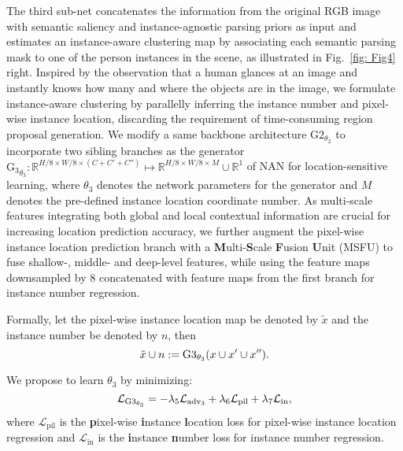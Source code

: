 \documentclass[10pt,twocolumn,letterpaper]{article}
\theoremstyle{definition}
\theoremstyle{remark}
\begin{document}
The third sub-net concatenates the information from the original RGB image with semantic saliency and instance-agnostic parsing priors as input and estimates an instance-aware clustering map by associating each semantic parsing mask to one of the person instances in the scene, as illustrated in Fig.~\ref{fig: Fig4} right. Inspired by the observation that a human glances at an image and instantly knows how many and where the objects are in the image, we formulate instance-aware clustering by parallelly inferring the instance number and pixel-wise instance location, discarding the requirement of time-consuming region proposal generation. We modify a same backbone architecture $\mathrm{G2}_{\theta_2}$ to incorporate two sibling branches as the generator $\mathrm{G_3}_{\theta_3} : \mathbb{R}^{H/8 \times W/8 \times (C+C{'}+C{''})} \mapsto \mathbb{R}^{H/8 \times W/8 \times M} \cup \mathbb{R}^1$ of NAN for location-sensitive learning, where $\theta_3$ denotes the network parameters for the generator and $M$  denotes the pre-defined instance location coordinate number. As multi-scale features integrating both global and local contextual information are crucial for increasing location prediction accuracy, we further augment the pixel-wise instance location prediction branch with a \textbf{M}ulti-\textbf{S}cale \textbf{F}usion \textbf{U}nit (MSFU) to fuse shallow-, middle- and deep-level features, while using the feature maps downsampled by $8$ concatenated with feature maps from the first branch for instance number regression.

Formally, let the pixel-wise instance location map be denoted by $\tilde{x}$ and the instance number be denoted by $n$, then
\begin{equation}
\small
\tilde{x} \cup n := \mathrm{G3}_{\theta_3}(x \cup x{'} \cup x{''}).
\end{equation}

We propose to learn $\theta_3$ by minimizing:
\begin{equation}
\small
\mathcal{L}_{\mathrm{G3_{\theta_3}}}=-\lambda_5 \mathcal{L}_{\mathrm{adv}_3}+\lambda_6\mathcal{L}_{\mathrm{pil}}+\lambda_7\mathcal{L}_{\mathrm{in}},
\end{equation}
where $\mathcal{L}_{\mathrm{pil}}$ is the \textbf{p}ixel-wise \textbf{i}nstance \textbf{l}ocation loss for pixel-wise instance location regression and $\mathcal{L}_{\mathrm{in}}$ is the \textbf{i}nstance \textbf{n}umber loss for instance number regression.
\end{document}
